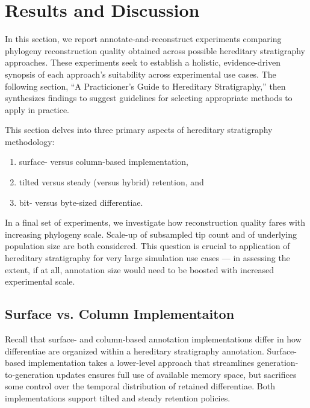 \section{Results and Discussion} \label{sec:results}

In this section, we report annotate-and-reconstruct experiments comparing phylogeny reconstruction quality obtained across possible hereditary stratigraphy approaches.
These experiments seek to establish a holistic, evidence-driven synopsis of each approach's suitability across experimental use cases.
The following section, ``A Practicioner's Guide to Hereditary Stratigraphy,'' then synthesizes findings to suggest guidelines for selecting appropriate methods to apply in practice.

This section delves into three primary aspects of hereditary stratigraphy methodology:
\begin{enumerate}
\item surface- versus column-based implementation,
\item tilted versus steady (versus hybrid) retention, and
\item bit- versus byte-sized differentiae.
\end{enumerate}

In a final set of experiments, we investigate how reconstruction quality fares with increasing phylogeny scale.
Scale-up of subsampled tip count and of underlying population size are both considered.
This question is crucial to application of hereditary stratigraphy for very large simulation use cases --- in assessing the extent, if at all, annotation size would need to be boosted with increased experimental scale.

\subsection{Surface vs. Column Implementaiton} \label{sec:surface-vs-column}



Recall that surface- and column-based annotation implementations differ in how differentiae are organized within a hereditary stratigraphy annotation.
Surface-based implementation takes a lower-level approach that streamlines generation-to-generation updates ensures full use of available memory space, but sacrifices some control over the temporal distribution of retained differentiae.
Both implementations support tilted and steady retention policies.

